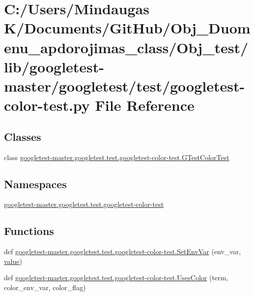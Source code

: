 \hypertarget{_obj__test_2lib_2googletest-master_2googletest_2test_2googletest-color-test_8py}{}\section{C\+:/\+Users/\+Mindaugas K/\+Documents/\+Git\+Hub/\+Obj\+\_\+\+Duomenu\+\_\+apdorojimas\+\_\+class/\+Obj\+\_\+test/lib/googletest-\/master/googletest/test/googletest-\/color-\/test.py File Reference}
\label{_obj__test_2lib_2googletest-master_2googletest_2test_2googletest-color-test_8py}
\subsection*{Classes}
\begin{DoxyCompactItemize}
\item 
class \mbox{\hyperlink{classgoogletest-master_1_1googletest_1_1test_1_1googletest-color-test_1_1_g_test_color_test}{googletest-\/master.\+googletest.\+test.\+googletest-\/color-\/test.\+G\+Test\+Color\+Test}}
\end{DoxyCompactItemize}
\subsection*{Namespaces}
\begin{DoxyCompactItemize}
\item 
 \mbox{\hyperlink{namespacegoogletest-master_1_1googletest_1_1test_1_1googletest-color-test}{googletest-\/master.\+googletest.\+test.\+googletest-\/color-\/test}}
\end{DoxyCompactItemize}
\subsection*{Functions}
\begin{DoxyCompactItemize}
\item 
def \mbox{\hyperlink{namespacegoogletest-master_1_1googletest_1_1test_1_1googletest-color-test_a819cae823706e5a48aebd10a81fa11e8}{googletest-\/master.\+googletest.\+test.\+googletest-\/color-\/test.\+Set\+Env\+Var}} (env\+\_\+var, \mbox{\hyperlink{_obj__test_2lib_2googletest-master_2googlemock_2test_2gmock-matchers__test_8cc_a337b8a670efc0b086ad3af163f3121b6}{value}})
\item 
def \mbox{\hyperlink{namespacegoogletest-master_1_1googletest_1_1test_1_1googletest-color-test_a805b9485c9d2f221b81a93ec3cf3cab0}{googletest-\/master.\+googletest.\+test.\+googletest-\/color-\/test.\+Uses\+Color}} (term, color\+\_\+env\+\_\+var, color\+\_\+flag)
\end{DoxyCompactItemize}
